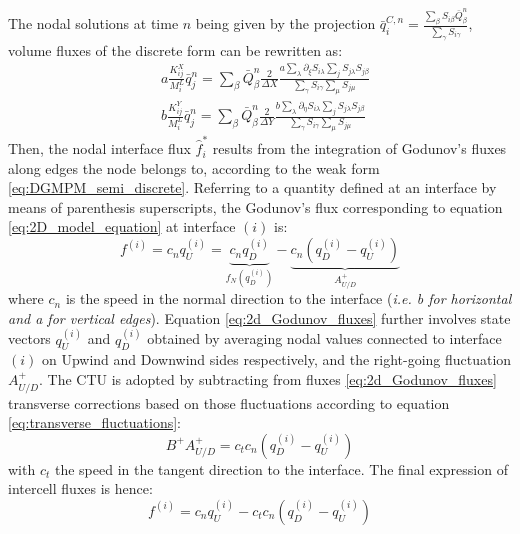The nodal solutions at time $n$ being given by the projection $\bar{q}^{C,n}_i=\frac{\sum_\beta S_{i\beta}\bar{Q}^n_\beta}{\sum_\gamma S_{i\gamma}}$, volume fluxes of the discrete form can be rewritten as:
\begin{equation}
  \label{eq:2Dvolume_fluxes}
  \begin{aligned}
    & a\frac{K_{ij}^X}{M_i^L}\bar{q}^n_j  = \sum_\beta \bar{Q}^n_\beta \frac{2}{\Delta X} \frac{a\sum_\lambda\partial_\xi S_{i\lambda}  \sum_j S_{j\lambda} S_{j\beta}}{\sum_\gamma  S_{i\gamma}\sum_\mu S_{j\mu}}\\
    & b\frac{K_{ij}^Y}{M_i^L}\bar{q}^n_j = \sum_\beta \bar{Q}^n_\beta\frac{2}{\Delta Y}  \frac{b \sum_\lambda\partial_\eta S_{i\lambda}  \sum_j S_{j\lambda} S_{j\beta}}{\sum_\gamma  S_{i\gamma}\sum_\mu S_{j\mu}}
  \end{aligned}
\end{equation}
Then, the nodal interface flux $\hat{f}_i^{*}$ results from the integration of Godunov's fluxes along edges the node belongs to, according to the weak form \eqref{eq:DGMPM_semi_discrete}.
Referring to a quantity defined at an interface by means of parenthesis superscripts, the Godunov's flux corresponding to equation \eqref{eq:2D_model_equation} at interface $(i)$ is:
\begin{equation}
  \label{eq:2d_Godunov_fluxes}
  f^{(i)}= c_n q^{(i)}_U = \underbrace{c_nq^{(i)}_D}_{f_N(q^{(i)}_D)} - \underbrace{c_n (q^{(i)}_D -q^{(i)}_U)}_{A^{+}_{U/D}} 
\end{equation}
where $c_n$ is the speed in the normal direction to the interface (\textit{i.e. b for horizontal and a for vertical edges}). Equation \eqref{eq:2d_Godunov_fluxes} further involves state vectors $q^{(i)}_U$ and $q^{(i)}_D$ obtained by averaging nodal values connected to interface $(i)$ on Upwind and Downwind sides respectively, and the right-going fluctuation $A_{U/D}^+$.
The CTU is adopted by subtracting from fluxes \eqref{eq:2d_Godunov_fluxes} transverse corrections based on those fluctuations according to equation \eqref{eq:transverse_fluctuations}:
\begin{equation}
  \label{eq:2D_transverse_corrections}
  B^+A^+_{U/D}=c_t c_n (q^{(i)}_D -q^{(i)}_U)
\end{equation}
with $c_t$ the speed in the tangent direction to the interface. The final expression of intercell fluxes is hence:
\begin{equation}
  \label{eq:CTU-fluxes}
  f^{(i)}= c_n q^{(i)}_U - c_t c_n (q^{(i)}_D -q^{(i)}_U)
\end{equation}
